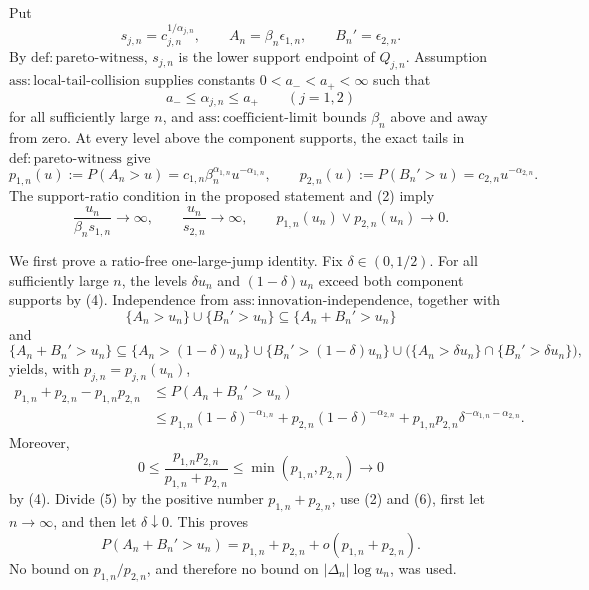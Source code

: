 Put
\[
s_{j,n}=c_{j,n}^{1/\alpha_{j,n}},\qquad
A_n=\beta_n\epsilon_{1,n},\qquad B_n'=\epsilon_{2,n}.
\tag{1}
\]
By \(\mathrm{def{:}pareto\text{-}witness}\), \(s_{j,n}\) is the lower support endpoint of \(Q_{j,n}\). Assumption \(\mathrm{ass{:}local\text{-}tail\text{-}collision}\) supplies constants \(0<a_-<a_+<\infty\) such that
\[
a_-\leq\alpha_{j,n}\leq a_+\qquad(j=1,2)
\tag{2}
\]
for all sufficiently large \(n\), and \(\mathrm{ass{:}coefficient\text{-}limit}\) bounds \(\beta_n\) above and away from zero. At every level above the component supports, the exact tails in \(\mathrm{def{:}pareto\text{-}witness}\) give
\[
p_{1,n}(u):=P(A_n>u)
=c_{1,n}\beta_n^{\alpha_{1,n}}u^{-\alpha_{1,n}},
\qquad
p_{2,n}(u):=P(B_n'>u)=c_{2,n}u^{-\alpha_{2,n}}.
\tag{3}
\]
The support-ratio condition in the proposed statement and (2) imply
\[
\frac{u_n}{\beta_ns_{1,n}}\to\infty,
\qquad
\frac{u_n}{s_{2,n}}\to\infty,
\qquad
p_{1,n}(u_n)\vee p_{2,n}(u_n)\to0.
\tag{4}
\]

We first prove a ratio-free one-large-jump identity. Fix \(\delta\in(0,1/2)\). For all sufficiently large \(n\), the levels \(\delta u_n\) and \((1-\delta)u_n\) exceed both component supports by (4). Independence from \(\mathrm{ass{:}innovation\text{-}independence}\), together with
\[
\{A_n>u_n\}\cup\{B_n'>u_n\}
\subseteq\{A_n+B_n'>u_n\}
\]
and
\[
\{A_n+B_n'>u_n\}
\subseteq
\{A_n>(1-\delta)u_n\}\cup\{B_n'>(1-\delta)u_n\}
\cup\bigl(\{A_n>\delta u_n\}\cap\{B_n'>\delta u_n\}\bigr),
\]
yields, with \(p_{j,n}=p_{j,n}(u_n)\),
\[
\begin{split}
p_{1,n}+p_{2,n}-p_{1,n}p_{2,n}
&\leq P(A_n+B_n'>u_n)\\
&\leq p_{1,n}(1-\delta)^{-\alpha_{1,n}}
+p_{2,n}(1-\delta)^{-\alpha_{2,n}}
+p_{1,n}p_{2,n}\delta^{-\alpha_{1,n}-\alpha_{2,n}}.
\end{split}
\tag{5}
\]
Moreover,
\[
0\leq\frac{p_{1,n}p_{2,n}}{p_{1,n}+p_{2,n}}
\leq\min(p_{1,n},p_{2,n})\to0
\tag{6}
\]
by (4). Divide (5) by the positive number \(p_{1,n}+p_{2,n}\), use (2) and (6), first let \(n\to\infty\), and then let \(\delta\downarrow0\). This proves
\[
P(A_n+B_n'>u_n)
=p_{1,n}+p_{2,n}+o(p_{1,n}+p_{2,n}).
\tag{7}
\]
No bound on \(p_{1,n}/p_{2,n}\), and therefore no bound on \(|\Delta_n|\log u_n\), was used.

